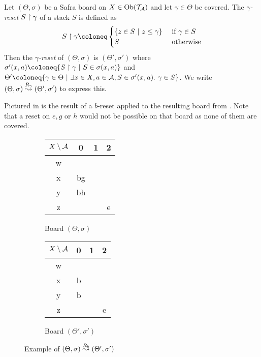 \begin{definition}\label{def:reset}
  Let $(\Theta, \sigma)$ be a Safra board on $X \in \mathrm{Ob}(\mathcal{T}_{\mathcal{A}})$ and let
  $\gamma \in \Theta$ be covered. The \emph{$\gamma$-reset} \emph{$S \upharpoonright \gamma$} of a stack
  $S$ is defined as 
  \[
    \sreset{S}{\gamma} \coloneq
    \begin{cases}
      \{z \in S ~|~ z \leq \gamma\} & \text{ if } \gamma \in S \\
      S & \text{ otherwise}
    \end{cases}
  \]
  Then the \emph{$\gamma$-reset} of $(\Theta, \sigma)$ is $(\Theta', \sigma')$
  where \(\sigma'(x, a) \coloneq \{\sreset{S}{\gamma} ~|~ S \in \sigma(x,
  a)\}\) and
  \(
    \Theta' \coloneq \{\gamma \in \Theta ~|~ \exists x \in X, a \in \Aa, S \in
    \sigma'(x, a).~\gamma \in S\}\).
  We write $(\Theta, \sigma) \stackrel{R_\gamma}{\leadsto} (\Theta', \sigma')$ to express this.
\end{definition}
\begin{example}\label{ex:reset}
  Pictured in  is the result of a $b$-reset applied to the
  resulting board from . Note that a reset on $e, g$ or $h$ would
  not be possible on that board as none of them are covered.

  \begin{figure}[h]
    \centering
    
    \begin{subfigure}[b]{0.45\textwidth}
      \centering
      \begin{tabular}{|c|c|c|c|}
        \hline
        $X \setminus \mathcal{A}$& 0 & 1 & 2 \\
        \hline
        w & & & \\
        \hline
        x & bg & & \\
        \hline
        y & bh & & \\
        \hline
        z & & & e \\
        \hline
      \end{tabular}
      \caption{Board $(\Theta, \sigma)$}
      \label{fig:reset-a}
    \end{subfigure}
    \begin{subfigure}[b]{0.45\textwidth}
      \centering
      \begin{tabular}{|c|c|c|c|}
        \hline
        $X \setminus \mathcal{A}$& 0 & 1 & 2 \\
        \hline
        w & & & \\
        \hline
        x & b & & \\
        \hline
        y & b & & \\
        \hline
        z & & & e \\
        \hline
      \end{tabular}
      \caption{Board $(\Theta', \sigma')$}
      \label{fig:reset-b}
    \end{subfigure}
    \caption{Example of $(\Theta, \sigma) \stackrel{R_b}{\leadsto} (\Theta', \sigma')$}
    \label{fig:reset}
  \end{figure}
\end{example}

